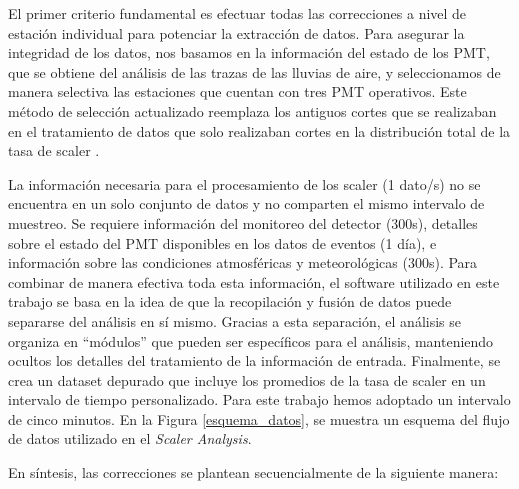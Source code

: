El primer criterio fundamental es efectuar todas las correcciones a nivel de estación individual para potenciar la extracción de datos. Para asegurar la integridad de los datos, nos basamos en la información del estado de los PMT, que se obtiene del análisis de las trazas de las lluvias de aire, y seleccionamos de manera selectiva las estaciones que cuentan con tres PMT operativos. Este método de selección actualizado reemplaza los antiguos cortes que se realizaban en el tratamiento de datos que solo realizaban cortes en la distribución total de la tasa de scaler \cite{martin_ICRC}.

La información necesaria para el procesamiento de los scaler (1 dato/s) no se encuentra en un solo conjunto de datos y no comparten el mismo intervalo de muestreo. Se requiere información del monitoreo del detector (300s), detalles sobre el estado del PMT disponibles en los datos de eventos (1 día), e información sobre las condiciones atmosféricas y meteorológicas (300s). Para combinar de manera efectiva toda esta información, el software utilizado en este trabajo se basa en la idea de que la recopilación y fusión de datos puede separarse del análisis en sí mismo. Gracias a esta separación, el análisis se organiza en “módulos” que pueden ser específicos para el análisis, manteniendo ocultos los detalles del tratamiento de la información de entrada. Finalmente, se crea un dataset depurado que incluye los promedios de la tasa de scaler en un intervalo de tiempo personalizado. Para este trabajo hemos adoptado un intervalo de cinco minutos. En la Figura \ref{esquema_datos}, se muestra un esquema del flujo de datos utilizado en el \textit{Scaler Analysis}. 

En síntesis, las correcciones se plantean secuencialmente de la siguiente manera:

